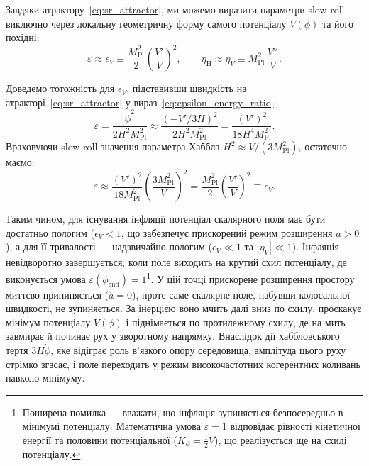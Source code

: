 \documentclass[12pt, a4paper]{article}
\begin{document}
Завдяки атрактору~\eqref{eq:sr_attractor}, ми можемо виразити параметри slow-roll виключно через локальну геометричну форму самого потенціалу $V(\phi)$ та його похідні:
\begin{equation}\label{eq:slow_roll_pot}
  \varepsilon \approx \epsilon_V
  \equiv \frac{M_\mathrm{Pl}^2}{2}\left(\frac{V'}{V}\right)^2,
  \qquad
  \eta_{\mathrm{H}} \approx \eta_V
  \equiv M_\mathrm{Pl}^2\,\frac{V''}{V}.
\end{equation}

Доведемо тотожність для $\epsilon_V$, підставивши швидкість на атракторі~\eqref{eq:sr_attractor} у вираз~\eqref{eq:epsilon_energy_ratio}:
\begin{equation*}
  \varepsilon = \frac{\dot\phi^2}{2H^2 M_\mathrm{Pl}^2} \approx \frac{(-V'/3H)^2}{2H^2 M_\mathrm{Pl}^2} = \frac{(V')^2}{18 H^4 M_\mathrm{Pl}^2}.
\end{equation*}
Враховуючи slow-roll значення параметра Хаббла $H^2 \approx V / (3M_\mathrm{Pl}^2)$, остаточно маємо:
\begin{equation*}
  \varepsilon \approx \frac{(V')^2}{18 M_\mathrm{Pl}^2} \left( \frac{3M_\mathrm{Pl}^2}{V} \right)^2 = \frac{M_\mathrm{Pl}^2}{2}\left(\frac{V'}{V}\right)^2 \equiv \epsilon_V.
\end{equation*}

Таким чином, для існування інфляції потенціал скалярного поля має бути достатньо пологим ($\epsilon_V < 1$, що забезпечує прискорений режим розширення $\ddot{a} > 0$), а для її тривалості --- надзвичайно пологим ($\epsilon_V \ll 1$ та $|\eta_V| \ll 1$). Інфляція невідворотно завершується, коли поле виходить на крутий схил потенціалу, де виконується умова $\varepsilon(\phi_{\mathrm{end}}) = 1$\footnote{Поширена помилка --- вважати, що інфляція зупиняється безпосередньо в мінімумі потенціалу. Математична умова $\varepsilon = 1$ відповідає рівності кінетичної енергії та половини потенціальної ($K_\phi = \frac{1}{2}V$), що реалізується ще на схилі потенціалу.}. У цій точці прискорене розширення простору миттєво припиняється ($\ddot{a}=0$), проте саме скалярне поле, набувши колосальної швидкості, не зупиняється. За інерцією воно мчить далі вниз по схилу, проскакує мінімум потенціалу $V(\phi)$ і піднімається по протилежному схилу, де на мить завмирає й починає рух у зворотному напрямку. Внаслідок дії хаббловського тертя $3H\dot{\phi}$, яке відіграє роль в'язкого опору середовища, амплітуда цього руху стрімко згасає, і поле переходить у режим високочастотних когерентних коливань навколо мінімуму.
\end{document}
